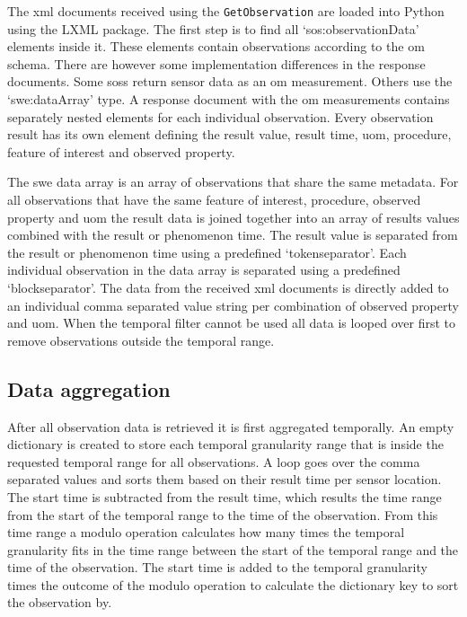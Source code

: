 \begin{sloppypar}
The \ac{xml} documents received using the \texttt{GetObservation} are loaded into Python using the LXML package. The first step is to find all `sos:observationData' elements inside it. These elements contain observations according to the \ac{om} schema. There are however some implementation differences in the response documents. Some \aclp{sos} return sensor data as an \ac{om} measurement. Others use the `\ac{swe}:dataArray' type. A response document with the \ac{om} measurements contains separately nested elements for each individual observation. Every observation result has its own element defining the result value, result time, \ac{uom}, procedure, feature of interest and observed property.  
\end{sloppypar}

The \ac{swe} data array is an array of observations that share the same metadata. For all observations that have the same feature of interest, procedure, observed property and \ac{uom} the result data is joined together into an array of  results values combined with the result or phenomenon time. The result value is separated from the result or phenomenon time using a predefined `tokenseparator'. Each individual observation in the data array is separated using a predefined `blockseparator'. The data from the received \ac{xml} documents is directly added to an individual comma separated value string per combination of observed property and \ac{uom}. When the temporal filter cannot be used all data is looped over first to remove observations outside the temporal range. 

\subsection{Data aggregation}
After all observation data is retrieved it is first aggregated temporally. An empty dictionary is created to store each temporal granularity range that is inside the requested temporal range for all observations. A loop goes over the comma separated values and sorts them based on their result time per sensor location. The start time is subtracted from the result time, which results the time range from the start of the temporal range to the time of the observation. From this time range a modulo operation calculates how many times the temporal granularity fits in the time range between the start of the temporal range and the time of the observation. The start time is added to the temporal granularity times the outcome of the modulo operation to calculate the dictionary key to sort the observation by.

